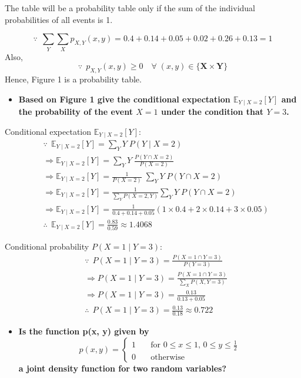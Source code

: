 \documentclass[11pt]{article}
\providecommand{\tightlist}{%
      \setlength{\itemsep}{0pt}\setlength{\parskip}{0pt}}
\begin{document}
    The table will be a probability table only if the sum of the individual
probabilities of all events is 1.

\[
\because\,\; \sum_Y \sum_X p_{X, Y}(x, y) = 0.4+0.14+0.05+0.02+0.26+0.13 = 1
\] Also, \[
\because\,\; p_{X, Y}(x, y) \geq 0 \quad \forall\; (x, y) \in \{\mathbf{X} \times \mathbf{Y}\}
\] Hence, Figure 1 is a probability table.

    \begin{itemize}
\tightlist
\item
  \textbf{Based on Figure 1 give the conditional expectation
  \(\mathbb{E}_{Y \mid X=2}[Y]\) and the probability of the event
  \(X=1\) under the condition that \(Y=3\).}
\end{itemize}

    Conditional expectation \(\mathbb{E}_{Y \mid X=2}[Y]\): \[
\begin{align*}
& \because \,\; \mathbb{E}_{Y \mid X=2}[Y] = \sum_Y Y\;P(Y \mid X=2) \\
& \Rightarrow \mathbb{E}_{Y \mid X=2}[Y] = \sum_Y Y\;\frac{P(Y \cap X=2)}{P(X=2)} \\
& \Rightarrow \mathbb{E}_{Y \mid X=2}[Y] = \frac{1}{P(X=2)}\; \sum_Y Y\; P(Y \cap X=2) \\
& \Rightarrow \mathbb{E}_{Y \mid X=2}[Y] = \frac{1}{\sum_Y P(X=2, Y)}\sum_Y Y\;P(Y \cap X=2) \\
& \Rightarrow \mathbb{E}_{Y \mid X=2}[Y] = \frac{1}{0.4+0.14+0.05}(1\times 0.4 + 2\times 0.14 + 3\times 0.05) \\
& \therefore \,\; \mathbb{E}_{Y \mid X=2}[Y] = \frac{0.83}{0.59} \approx 1.4068
\end{align*}
\]

Conditional probability \(P(X=1 \mid Y=3)\): \[
\begin{align*}
& \because \,\; P(X=1 \mid Y=3) = \frac{P(X=1 \cap Y=3)}{P(Y=3)} \\
& \Rightarrow P(X=1 \mid Y=3) = \frac{P(X=1 \cap Y=3)}{\sum_X P(X, Y=3)} \\
& \Rightarrow P(X=1 \mid Y=3) = \frac{0.13}{0.13 + 0.05} \\
& \therefore \,\; P(X=1 \mid Y=3) = \frac{0.13}{0.18} \approx 0.722
\end{align*}
\]

    \begin{itemize}
\tightlist
\item
  \textbf{Is the function p(x, y) given by} \[
  p(x, y) = \begin{cases}
  1 & \quad \text{for } 0\leq x\leq 1\text{, } 0\leq y\leq \frac{1}{2} \\
  0 & \quad \text{otherwise} \end{cases}
  \] \textbf{a joint density function for two random variables?}
\end{itemize}
\end{document}
